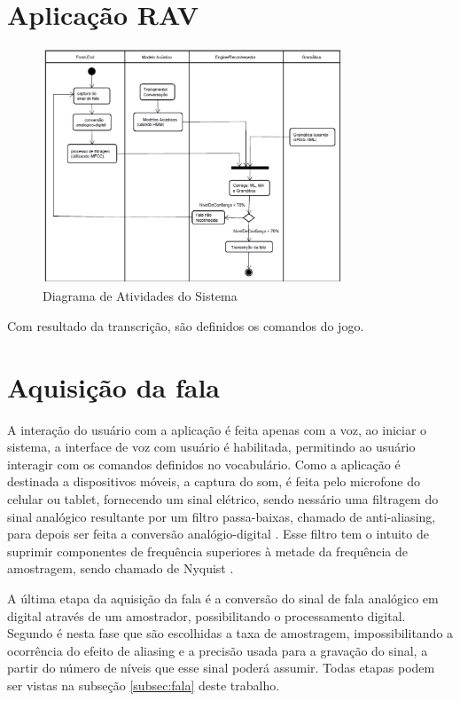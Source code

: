 \section{Aplicação RAV}
\begin{figure}[H]
\includegraphics[width=0.8\textwidth]{graficos/desenvolvimento_rav.eps}
\caption{Diagrama de Atividades do Sistema}
\end{figure}

Com resultado da transcrição, são definidos os comandos do jogo.

\section{Aquisição da fala}

A interação do usuário com a aplicação é feita apenas com a voz, ao iniciar o sistema, a interface de voz com usuário é habilitada, permitindo ao usuário interagir com os comandos definidos no vocabulário. Como a aplicação é destinada a dispositivos móveis, a captura do som, é feita pelo microfone do celular ou tablet, fornecendo um sinal elétrico, sendo nessário uma filtragem do sinal analógico resultante por um filtro passa-baixas, chamado de anti-aliasing, para depois ser feita a conversão analógio-digital \cite{DigitalProcRabiner}. Esse filtro tem o intuito de suprimir componentes de frequência superiores à metade da frequência de amostragem, sendo chamado de Nyquist \cite{DigitalSigProakis}.

A última etapa da aquisição da fala é a conversão do sinal de fala analógico em digital através de um
amostrador, possibilitando o processamento digital. Segundo  é nesta fase que são
escolhidas a taxa de amostragem, impossibilitando a ocorrência do efeito de aliasing e a precisão usada para a gravação do sinal, a partir do número de níveis que esse sinal poderá assumir. 
Todas etapas podem ser vistas na subseção \ref{subsec:fala} deste trabalho.


